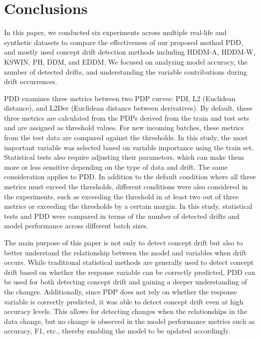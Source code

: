 \documentclass[pdflatex,sn-mathphys-ay]{sn-jnl}%
\theoremstyle{thmstyleone}%
\theoremstyle{thmstyletwo}%
\theoremstyle{thmstylethree}%
\begin{document}
\section{Conclusions}

In this paper, we conducted six experiments across multiple real-life and synthetic datasets to compare the effectiveness of our proposed method PDD, and mostly used concept drift detection methods including HDDM-A, HDDM-W, KSWIN, PH, DDM, and EDDM. We focused on analyzing model accuracy, the number of detected drifts, and understanding the variable contributions during drift occurrences.

PDD examines three metrics between two PDP curves: PDI, L2 (Euclidean distance), and L2Der (Euclidean distance between derivatives). By default, these three metrics are calculated from the PDPs derived from the train and test sets and are assigned as threshold values. For new incoming batches, these metrics from the test data are compared against the thresholds. In this study, the most important variable was selected based on variable importance using the train set. Statistical tests also require adjusting their parameters, which can make them more or less sensitive depending on the type of data and drift. The same consideration applies to PDD. In addition to the default condition where all three metrics must exceed the thresholds, different conditions were also considered in the experiments, such as exceeding the threshold in at least two out of three metrics or exceeding the thresholds by a certain margin. In this study, statistical tests and PDD were compared in terms of the number of detected drifts and model performance across different batch sizes.

The main purpose of this paper is not only to detect concept drift but also to better understand the relationship between the model and variables when drift occurs. While traditional statistical methods are generally used to detect concept drift based on whether the response variable can be correctly predicted, PDD can be used for both detecting concept drift and gaining a deeper understanding of the changes. Additionally, since PDP does not rely on whether the response variable is correctly predicted, it was able to detect concept drift even at high accuracy levels. This allows for detecting changes when the relationships in the data change, but no change is observed in the model performance metrics such as accuracy, F1, etc., thereby enabling the model to be updated accordingly.
\end{document}
